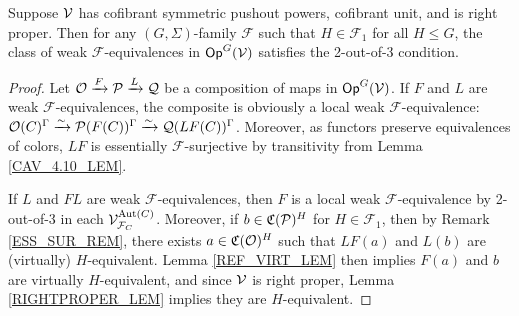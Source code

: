 \documentclass[a4paper,10pt
,draft
]{article}%
\renewcommand{\F}{\mathcal F}
\newcommand{\Q}{\mathcal Q}
\newcommand{\J}{\mathbb J}
\renewcommand{\1}{\eta}%
\begin{document}
\begin{proposition}
      \label{CAV_4.15_PROP}
      \label{2OUTOF3_PROP}
      Suppose $\V$ has cofibrant symmetric pushout powers, cofibrant unit, and is right proper.
      Then for any $(G, \Sigma)$-family $\F$ such that $H \in \F_1$ for all $H \leq G$, %
      the class of weak $\F$-equivalences in $\mathsf{Op}^G(\V)$ satisfies the 2-out-of-3 condition.
\end{proposition}
\begin{proof}
      Let $\O \xrightarrow{F} \P \xrightarrow{L} \Q$ be a composition of maps in $\mathsf{Op}^G(\V)$.
      If $F$ and $L$ are weak $\F$-equivalences,
      the composite is obviously a local weak $\F$-equivalence:
      $\O(C)^\Gamma \xrightarrow{\sim} \P(F(C))^\Gamma \xrightarrow{\sim} \Q(LF(C))^\Gamma$.
      Moreover, as functors preserve equivalences of colors, $L F$ is essentially $\F$-surjective by transitivity from Lemma \ref{CAV_4.10_LEM}. 
      
      If $L$ and $FL$ are weak $\F$-equivalences,
      then $F$ is a local weak $\F$-equivalence by 2-out-of-3 in each $\V^{\Aut(C)}_{\F_C}$.
      Moreover, if $b \in \mathfrak C(\P)^H$ for $H \in \F_1$, then by Remark \ref{ESS_SUR_REM}, there exists $a \in \mathfrak C(\O)^H$ such that
      $LF(a)$ and $L(b)$ are (virtually) $H$-equivalent.
      Lemma \ref{REF_VIRT_LEM} then implies $F(a)$ and $b$ are virtually $H$-equivalent, 
      and since $\V$ is right proper, Lemma \ref{RIGHTPROPER_LEM} implies they are $H$-equivalent.


\end{proof}
\end{document}
